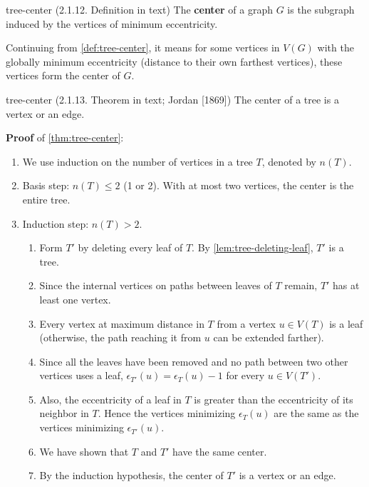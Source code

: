 \documentclass[../src/handouts/main.tex]{subfiles}
\begin{document}
\begin{definition}{}{tree-center}
  (2.1.12. Definition in text)
  The \textbf{center} of a graph $G$ is the subgraph induced by the vertices of minimum eccentricity.
\end{definition}

Continuing from \cref{def:tree-center}, it means for some vertices in $V(G)$ with the globally minimum eccentricity (distance to their own farthest vertices), these vertices form the center of $G$.

\begin{theorem}{}{tree-center}
  (2.1.13. Theorem in text; Jordan [1869])
  The center of a tree is a vertex or an edge.
\end{theorem}

\textbf{Proof} of \cref{thm:tree-center}:
\begin{enumerate}
  \item We use induction on the number of vertices in a tree $T$, denoted by $n(T)$.

  \item Basis step: $n(T) \leq 2$ (1 or 2). With at most two vertices, the center is the entire tree.

  \item Induction step: $n(T) > 2$.
    \begin{enumerate}
      \item Form $T'$ by deleting every leaf of $T$. By \cref{lem:tree-deleting-leaf}, $T'$ is a tree.
      \item Since the internal vertices on paths between leaves of $T$ remain, $T'$ has at least one vertex.
      \item Every vertex at maximum distance in $T$ from a vertex $u \in V(T)$ is a leaf (otherwise, the path reaching it from $u$ can be extended farther).
      \item Since all the leaves have been removed and no path between two other vertices uses a leaf, $\epsilon_{T'}(u) = \epsilon_T(u) - 1$ for every $u \in V \left( T' \right)$.
      \item Also, the eccentricity of a leaf in $T$ is greater than the eccentricity of its neighbor in $T$. Hence the vertices minimizing $\epsilon_T(u)$ are the same as the vertices minimizing $\epsilon_{T'}(u)$.
      \item We have shown that $T$ and $T'$ have the same center.
      \item By the induction hypothesis, the center of $T'$ is a vertex or an edge.
    \end{enumerate}
\end{enumerate}
\end{document}
